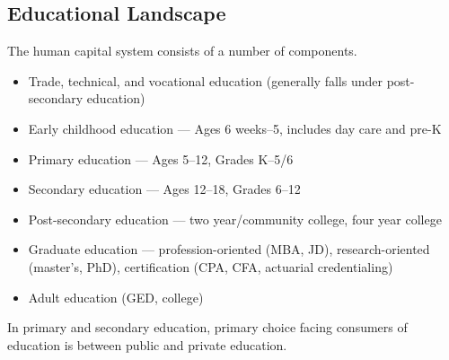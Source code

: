 \documentclass[10pt]{extarticle}
\begin{document}
  \subsection{Educational Landscape}%
  The human capital system consists of a number of components.
  \begin{itemize}
    \item Trade, technical, and vocational education (generally falls under post-secondary education)
    \item Early childhood education --- Ages 6 weeks--5, includes day care and pre-K
    \item Primary education --- Ages 5--12, Grades K--5/6
    \item Secondary education --- Ages 12--18, Grades 6--12
    \item Post-secondary education --- two year/community college, four year college
    \item Graduate education --- profession-oriented (MBA, JD), research-oriented (master's, PhD), certification (CPA, CFA, actuarial credentialing)
    \item Adult education (GED, college)
  \end{itemize}
  In primary and secondary education, primary choice facing consumers of education is between public and private education.
\end{document}
